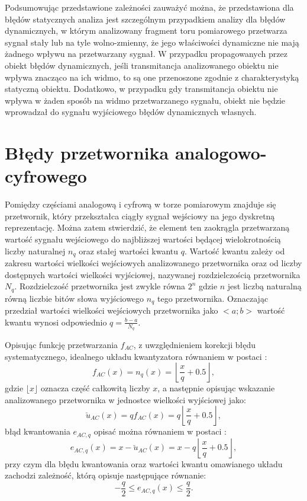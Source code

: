 Podsumowując przedstawione zależności zauważyć można, że przedstawiona dla błędów statycznych analiza jest szczególnym przypadkiem analizy dla błędów dynamicznych, w którym analizowany fragment toru pomiarowego przetwarza sygnał stały lub na tyle wolno-zmienny, że jego właściwości dynamiczne nie mają żadnego wpływu na przetwarzany sygnał. W przypadku propagowanych przez obiekt błędów dynamicznych, jeśli transmitancja analizowanego obiektu nie wpływa znacząco na ich widmo, to są one przenoszone zgodnie z charakterystyką statyczną obiektu. Dodatkowo, w przypadku gdy transmitancja obiektu nie wpływa w żaden sposób na widmo przetwarzanego sygnału, obiekt nie będzie wprowadzał do sygnału wyjściowego błędów dynamicznych własnych.

\section{Błędy przetwornika analogowo-cyfrowego}

Pomiędzy częściami analogową i cyfrową w torze pomiarowym znajduje się przetwornik, który przekształca ciągły sygnał wejściowy na jego dyskretną reprezentację. Można zatem stwierdzić, że element ten zaokrągla przetwarzaną wartość sygnału wejściowego do najbliższej wartości będącej wielokrotnością liczby naturalnej $n_{q}$ oraz stałej wartości kwantu $q$. Wartość kwantu zależy od zakresu wartości wielkości wejściowych analizowanego przetwornika oraz od liczby dostępnych wartości wielkości wyjściowej, nazywanej rozdzielczością przetwornika $N_{q}$. Rozdzielczość przetwornika jest zwykle równa $2^{n}$ gdzie $n$ jest liczbą naturalną równą liczbie bitów słowa wyjściowego $n_{q}$ tego przetwornika. Oznaczając przedział wartości wielkości wejściowych przetwornika jako $<a;b>$ wartość kwantu wynosi odpowiednio $q = \frac{b - a}{N_{q}}$.

Opisując funkcję przetwarzania $f_{AC}$, z uwzględnieniem korekcji błędu systematycznego, idealnego układu kwantyzatora równaniem w postaci \cite{jakubiec_system}:
\begin{equation}
f_{AC}(x) = n_{q}(x) = \left\lfloor \frac{x}{q} + 0.5 \right\rfloor \label{eqn_adc_function},
\end{equation}
gdzie $\lfloor x \rfloor$ oznacza część całkowitą liczby $x$,  a następnie opisując wskazanie analizowanego przetwornika w jednostce wielkości wyjściowej jako:
\begin{equation}
\breve{u}_{AC}(x) = q f_{AC}(x) = q \left\lfloor \frac{x}{q} + 0.5 \right\rfloor \label{eqn_adc_output},
\end{equation}
błąd kwantowania $e_{AC,q}$ opisać można równaniem w postaci \cite{jakubiec_system}:
\begin{equation}
e_{AC,q}(x) = x - \breve{u}_{AC}(x) = x - q \left\lfloor \frac{x}{q} + 0.5 \right\rfloor \label{eqn_adc_qerror},
\end{equation}
przy czym dla błędu kwantowania oraz wartości kwantu omawianego układu zachodzi zależność, którą opisuje następujące równanie:
\begin{equation}
-\frac{q}{2} \le e_{AC,q}(x) \le \frac{q}{2} \label{eqn_adc_qerrrange}.
\end{equation}

